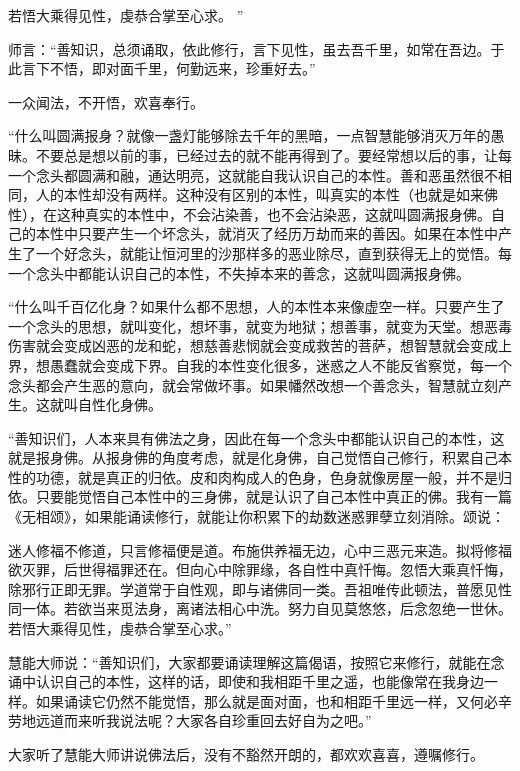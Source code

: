 \documentclass[12pt,twoside,openany]{book}
\newcommand{\kai}[1]{{\CJKfamily{kai}#1}}
\begin{document}
若悟大乘得见性，虔恭合掌至心求。
”

师言：“善知识，总须诵取，依此修行，言下见性，虽去吾千里，如常在吾边。于此言下不悟，即对面千里，何勤远来，珍重好去。”

一众闻法，不开悟，欢喜奉行。

\kai{“什么叫圆满报身？就像一盏灯能够除去千年的黑暗，一点智慧能够消灭万年的愚昧。不要总是想以前的事，已经过去的就不能再得到了。要经常想以后的事，让每一个念头都圆满和融，通达明亮，这就能自我认识自己的本性。善和恶虽然很不相同，人的本性却没有两样。这种没有区别的本性，叫真实的本性（也就是如来佛性），在这种真实的本性中，不会沾染善，也不会沾染恶，这就叫圆满报身佛。自己的本性中只要产生一个坏念头，就消灭了经历万劫而来的善因。如果在本性中产生了一个好念头，就能让恒河里的沙那样多的恶业除尽，直到获得无上的觉悟。每一个念头中都能认识自己的本性，不失掉本来的善念，这就叫圆满报身佛。
	
“什么叫千百亿化身？如果什么都不思想，人的本性本来像虚空一样。只要产生了一个念头的思想，就叫变化，想坏事，就变为地狱；想善事，就变为天堂。想恶毒伤害就会变成凶恶的龙和蛇，想慈善悲悯就会变成救苦的菩萨，想智慧就会变成上界，想愚蠢就会变成下界。自我的本性变化很多，迷惑之人不能反省察觉，每一个念头都会产生恶的意向，就会常做坏事。如果幡然改想一个善念头，智慧就立刻产生。这就叫自性化身佛。

“善知识们，人本来具有佛法之身，因此在每一个念头中都能认识自己的本性，这就是报身佛。从报身佛的角度考虑，就是化身佛，自己觉悟自己修行，积累自己本性的功德，就是真正的归依。皮和肉构成人的色身，色身就像房屋一般，并不是归依。只要能觉悟自己本性中的三身佛，就是认识了自己本性中真正的佛。我有一篇《无相颂》，如果能诵读修行，就能让你积累下的劫数迷惑罪孽立刻消除。颂说：

迷人修福不修道，只言修福便是道。布施供养福无边，心中三恶元来造。拟将修福欲灭罪，后世得福罪还在。但向心中除罪缘，各自性中真忏悔。忽悟大乘真忏悔，除邪行正即无罪。学道常于自性观，即与诸佛同一类。吾祖唯传此顿法，普愿见性同一体。若欲当来觅法身，离诸法相心中洗。努力自见莫悠悠，后念忽绝一世休。若悟大乘得见性，虔恭合掌至心求。”

慧能大师说：“善知识们，大家都要诵读理解这篇偈语，按照它来修行，就能在念诵中认识自己的本性，这样的话，即使和我相距千里之遥，也能像常在我身边一样。如果诵读它仍然不能觉悟，那么就是面对面，也和相距千里远一样，又何必辛劳地远道而来听我说法呢？大家各自珍重回去好自为之吧。”

大家听了慧能大师讲说佛法后，没有不豁然开朗的，都欢欢喜喜，遵嘱修行。}
\end{document}
